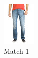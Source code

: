 \begin{figure}[H]
\begin{subfigure}[b]{0.19\textwidth}
        \includegraphics[width=\textwidth]{images/output4.jpeg}
        \caption{Match 1}
    \end{subfigure}
    \begin{subfigure}[b]{0.19\textwidth}

\end{subfigure}
\end{figure}
